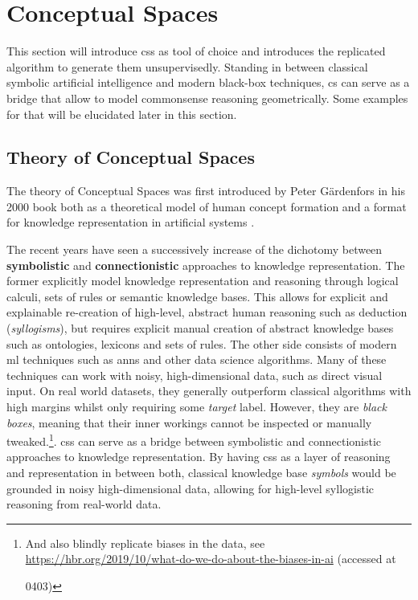 \section{Conceptual Spaces}
\label{sec:cs}


This section will introduce \glspl{cs} as tool of choice and introduces the replicated algorithm to generate them unsupervisedly. Standing in between classical symbolic artificial intelligence and modern black-box techniques, \gls{cs} can serve as a bridge that allow to model commonsense reasoning geometrically. Some examples for that will be elucidated later in this section.

\subsection*{Theory of Conceptual Spaces}

The theory of Conceptual Spaces was first introduced by Peter Gärdenfors in his 2000 book  \cite{Gardenfors2000a} both as a theoretical model of human concept formation and a format for knowledge representation in artificial systems \cite{Gardenfors2004}. 

The recent years have seen a successively increase of the dichotomy between \textbf{symbolistic} and \textbf{connectionistic} approaches to knowledge representation. The former explicitly model knowledge representation and reasoning through \eg logical calculi, sets of rules or semantic knowledge bases. This allows for explicit and explainable re-creation of high-level, abstract human reasoning such as deduction (\textit{syllogisms}), but requires explicit manual creation of abstract knowledge bases such as ontologies, lexicons and sets of rules. The other side consists of modern \gls{ml} techniques such as \glspl{ann} and other data science algorithms. Many of these techniques can work with noisy, high-dimensional data, such as direct visual input. On real world datasets, they generally outperform classical algorithms with high margins whilst only requiring some \textit{target} label. However, they are \textit{black boxes}, meaning that their inner workings cannot be inspected or manually tweaked.\footnote{And also blindly replicate biases in the data, see \eg \url{https://hbr.org/2019/10/what-do-we-do-about-the-biases-in-ai} (accessed at \date{2022}{04}{03})}. \glspl{cs} can serve as a bridge between symbolistic and connectionistic approaches to knowledge representation. By having \glspl{cs} as a layer of reasoning and representation in between both, classical knowledge base \textit{symbols} would be grounded in noisy high-dimensional data, allowing for high-level syllogistic reasoning from real-world data.

